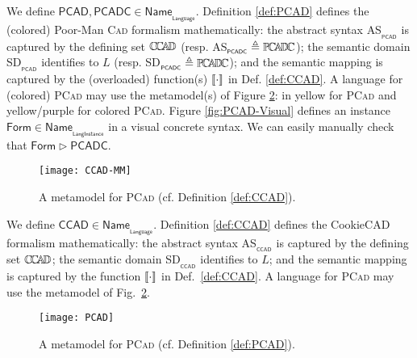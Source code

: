 \begin{olddef}
\begin{Example}
      We define $\mathsf{PCAD, PCADC} \in 
\mathsf{Name}_{_{\mathsf{Language}}}$. Definition \ref{def:PCAD} defines the 
(colored) Poor-Man \textsc{Cad} formalism mathematically: the abstract syntax 
\textsf{AS}$_{_{\mathsf{PCAD}}}$ is captured by the defining set $\mathbb{C}\!\mathbb{C}\!\mathbb{A}\!\mathbb{D} $ (resp. 
\textsf{AS}$_{_{\mathsf{PCADC}}} \triangleq \mathbb{P}\!\mathbb{C}\!\mathbb{A}\!\mathbb{D} \!\mathbb{C} $); the semantic domain 
\textsf{SD}$_{_{\mathsf{PCAD}}}$ identifies to $L$ (resp. 
\textsf{SD}$_{_{\mathsf{PCADC}}} \triangleq \mathbb{P}\!\mathbb{C}\!\mathbb{A}\!\mathbb{D} \!\mathbb{C} $); and the semantic mapping is 
captured by the (overloaded) function(s) $\llbracket \cdot \rrbracket$ in Def. \ref{def:CCAD}. A 
language for (colored) \textsc{PCad} may use the metamodel(s) of Figure 
\ref{fig:PCAD-MM}: in yellow for \textsc{PCad} and yellow/purple for colored 
\textsc{PCad}. Figure \ref{fig:PCAD-Visual} defines an instance 
$\mathsf{Form}\in\mathsf{Name}_{_{\mathsf{LangInstance}}}$ in a visual concrete 
syntax. We can easily manually check that $\mathsf{Form}\rhd \mathsf{PCADC}$.

\begin{figure}[t]
   \centering
   \texttt{[image: CCAD-MM]}
   \caption{A metamodel for \textsc{PCad} (cf. Definition 
\ref{def:CCAD}).}%
   \label{fig:PCAD-MM}%
\end{figure}
\end{Example}
\end{olddef}

\begin{newdef}
\begin{Example}
      We define $\mathsf{CCAD} \in 
\mathsf{Name}_{_{\mathsf{Language}}}$. Definition \ref{def:CCAD} defines the 
CookieCAD formalism mathematically: 
the abstract syntax \textsf{AS}$_{_{\mathsf{CCAD}}}$ is captured by the 
defining set $\mathbb{C}\!\mathbb{C}\!\mathbb{A}\!\mathbb{D} $; 
the semantic domain \textsf{SD}$_{_{\mathsf{CCAD}}}$ identifies to $L$; 
and the semantic mapping is captured by the function $\llbracket \cdot \rrbracket$ in 
Def.~\ref{def:CCAD}. 
A language for \textsc{PCad} may use the metamodel of Fig.~\ref{fig:PCAD-MM}. 

\begin{figure}[t]
   \centering
   \texttt{[image: PCAD]}
   \caption{A metamodel for \textsc{PCad} (cf. Definition 
\ref{def:PCAD}).}%
   \label{fig:PCAD-MM}%
\end{figure}
\end{Example}
\end{newdef}

